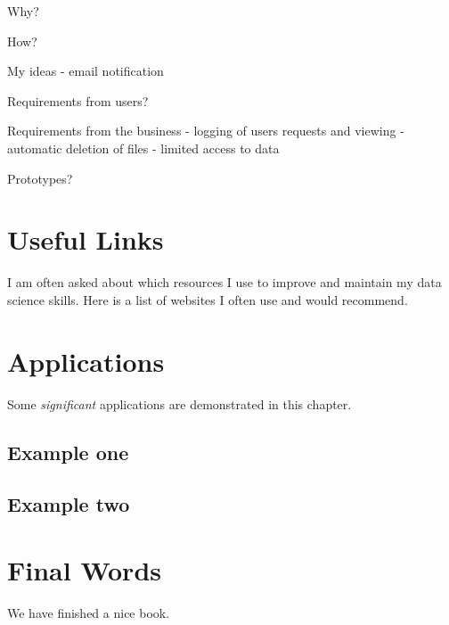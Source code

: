 \documentclass[]{book}
\begin{document}
Why?

How?

My ideas
- email notification

Requirements from users?

Requirements from the business
- logging of users requests and viewing
- automatic deletion of files
- limited access to data

Prototypes?

\hypertarget{useful-links}{%
\chapter{Useful Links}\label{useful-links}}

I am often asked about which resources I use to improve and maintain my data science skills. Here is a list of websites I often use and would recommend.

\hypertarget{applications}{%
\chapter{Applications}\label{applications}}

Some \emph{significant} applications are demonstrated in this chapter.

\hypertarget{example-one}{%
\section{Example one}\label{example-one}}

\hypertarget{example-two}{%
\section{Example two}\label{example-two}}

\hypertarget{final-words}{%
\chapter{Final Words}\label{final-words}}

We have finished a nice book.
\end{document}
